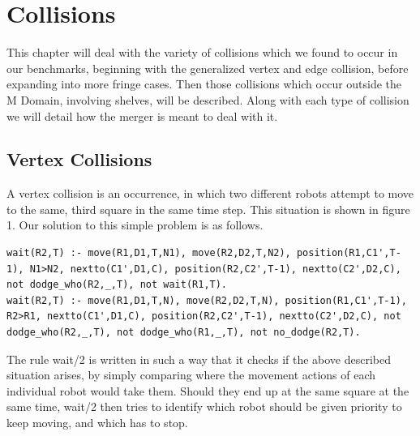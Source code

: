 \documentclass{llncs}
\begin{document}
\section{Collisions}
This chapter will deal with the variety of collisions which we found to occur in our benchmarks, beginning with the generalized vertex and edge collision, before expanding into more fringe cases. Then those collisions which occur outside the M Domain, involving shelves, will be described. Along with each type of collision we will detail how the merger is meant to deal with it.
\subsection{Vertex Collisions}
A vertex collision is an occurrence, in which two different robots attempt to move to the same, third square in the same time step. This situation is shown in figure 1. 
Our solution to this simple problem is as follows.
\begin{lstlisting}[basicstyle=\fontsize{9}{11}\selectfont\ttfamily,frame=single,breaklines=true]
wait(R2,T) :- move(R1,D1,T,N1), move(R2,D2,T,N2), position(R1,C1',T-1), N1>N2, nextto(C1',D1,C), position(R2,C2',T-1), nextto(C2',D2,C), not dodge_who(R2,_,T), not wait(R1,T).
wait(R2,T) :- move(R1,D1,T,N), move(R2,D2,T,N), position(R1,C1',T-1), R2>R1, nextto(C1',D1,C), position(R2,C2',T-1), nextto(C2',D2,C), not dodge_who(R2,_,T), not dodge_who(R1,_,T), not no_dodge(R2,T).
\end{lstlisting}
The rule wait/2 is written in such a way that it checks if the above described situation arises, by simply comparing where the movement actions of each individual robot would take them.
Should they end up at the same square at the same time, wait/2 then tries to identify which robot should be given priority to keep moving, and which has to stop.
\end{document}
